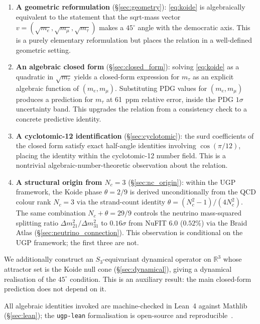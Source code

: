 \documentclass[11pt]{article}
\theoremstyle{remark}
\begin{document}
\begin{enumerate}[leftmargin=1.3em,itemsep=0.15em]
  \item \textbf{A geometric reformulation} (\S\ref{sec:geometry}): \eqref{eq:koide} is algebraically equivalent to the statement that the sqrt-mass vector $v = (\sqrt{m_e}, \sqrt{m_\mu}, \sqrt{m_\tau})$ makes a $45^\circ$ angle with the democratic axis.  This is a purely elementary reformulation but places the relation in a well-defined geometric setting.

  \item \textbf{An algebraic closed form} (\S\ref{sec:closed_form}): solving \eqref{eq:koide} as a quadratic in $\sqrt{m_\tau}$ yields a closed-form expression for $m_\tau$ as an explicit algebraic function of $(m_e, m_\mu)$.  Substituting PDG values for $(m_e, m_\mu)$ produces a prediction for $m_\tau$ at 61~ppm relative error, inside the PDG $1\sigma$ uncertainty band.  This upgrades the relation from a consistency check to a concrete predictive identity.

  \item \textbf{A cyclotomic-12 identification} (\S\ref{sec:cyclotomic}): the surd coefficients of the closed form satisfy exact half-angle identities involving $\cos(\pi/12)$, placing the identity within the cyclotomic-12 number field.  This is a nontrivial algebraic-number-theoretic observation about the relation.

  \item \textbf{A structural origin from $N_c = 3$} (\S\ref{sec:nc_origin}): within the UGP framework, the Koide phase $\theta = 2/9$ is derived unconditionally from the QCD colour rank $N_c = 3$ via the strand-count identity $\theta = (N_c^2 - 1)/(4N_c^2)$.  The same combination $N_c + \theta = 29/9$ controls the neutrino mass-squared splitting ratio $\Delta m^2_{21}/\Delta m^2_{31}$ to $0.16\sigma$ from NuFIT 6.0 ($0.52\%$) via the Braid Atlas (\S\ref{sec:neutrino_connection}).  This observation is conditional on the UGP framework; the first three are not.
\end{enumerate}

We additionally construct an $S_3$-equivariant dynamical operator on $\mathbb{R}^3$ whose attractor set is the Koide null cone (\S\ref{sec:dynamical}), giving a dynamical realisation of the $45^\circ$ condition.  This is an auxiliary result: the main closed-form prediction does not depend on it.

All algebraic identities invoked are machine-checked in Lean~4 against Mathlib (\S\ref{sec:lean}); the \texttt{ugp-lean} formalisation is open-source and reproducible~\cite{ugp-lean}.
\end{document}
